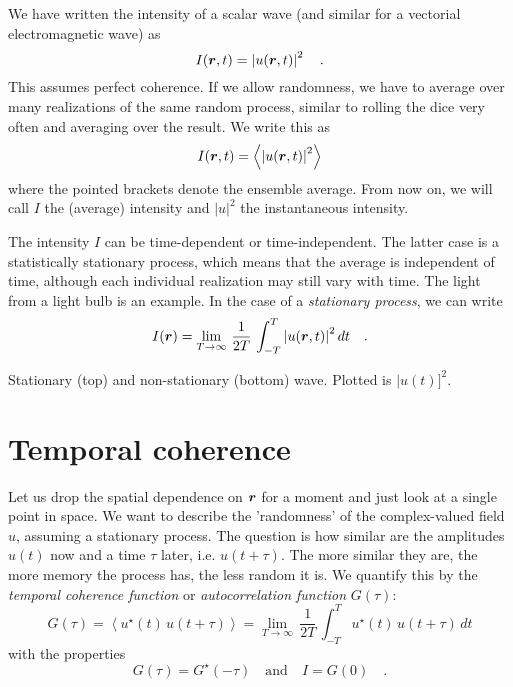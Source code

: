 We have written the intensity of a scalar wave (and similar for a vectorial electromagnetic wave) as
\begin{equation}
    I(\boldsymbol{r}, t) = \left| u(\boldsymbol{r}, t ) \right|^2 \quad . \label{eq:7_coherent_wave}
\end{equation}
This assumes perfect coherence. If we allow randomness, we have to average over many realizations of the same random process, similar to rolling the dice very often and averaging over the result. We write this as
\begin{equation}
    I(\boldsymbol{r}, t) =  \left< \left| u(\boldsymbol{r}, t ) \right|^2 \right>
\end{equation}
where the pointed brackets denote the ensemble average. From now on, we will call $I$ the (average) intensity and $|u|^2$ the instantaneous intensity.

The intensity $I$ can be time-dependent or time-independent. The latter case is a statistically stationary process, which means that the average is independent of time, although each individual realization may still vary with time. The light from a light bulb is an example. In the case of a \emph{stationary process}, we can  write
\begin{equation}
    I(\boldsymbol{r}) =  \lim_{T \rightarrow \infty} \, \frac{1}{2T} \, \int_{-T}^T \left| u(\boldsymbol{r}, t ) \right|^2  dt \quad .
\end{equation}



\begin{marginfigure}
    \caption{Stationary (top) and non-stationary (bottom) wave. \newline Plotted is $|u(t)]^2$.}
\end{marginfigure}

\section{Temporal coherence}

Let us drop the spatial dependence on $\boldsymbol{r}$ for a moment and just look at a single point in space. We want to describe the 'randomness' of the complex-valued field $u$, assuming a stationary process. The question is how similar are the amplitudes $u(t)$ now and a time $\tau$ later, i.e. $u(t + \tau)$. The more similar they are, the more memory the process has, the less random it is. We quantify this by the \emph{temporal coherence function} or \emph{autocorrelation function} $G(\tau)$:
\begin{equation}
    G(\tau) = \left< u^\star(t) \, u(t + \tau) \right> = 
    \lim_{T \rightarrow \infty} \, \frac{1}{2T} \, \int_{-T}^T u^\star(t) \, u(t + \tau)  \,  dt
\end{equation}
with the properties
\begin{equation}
    G(\tau) = G^\star(- \tau) \quad \text{and} \quad I = G(0) \quad .
\end{equation}

